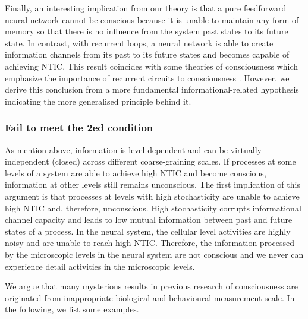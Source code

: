 \documentclass[utf8]{article}
\begin{document}
    		Finally, an interesting implication from our theory is that a pure feedforward neural network cannot be conscious because it is unable to maintain any form of memory so that there is no influence from the system past states to its future state. In contrast, with recurrent loops, a neural network is able to create information channels from its past to its future states and becomes capable of achieving NTIC. This result coincides with some theories of consciousness which emphasize the importance of recurrent circuits to consciousness \citep{lamme2006towards, edelman1992bright, tononi2008neural}.
    		However, we derive this conclusion from a more fundamental informational-related hypothesis indicating the more generalised principle behind it. 


        \subsubsection*{Fail to meet the 2\lowercase{ed} condition}
        As mention above, information is level-dependent and can be virtually independent (closed) across different coarse-graining scales. If processes at some levels of a system are able to achieve high NTIC and become conscious, information at other levels still remains unconscious. The first implication of this argument is that processes at levels with high stochasticity are unable to achieve high NTIC and, therefore, unconscious. High stochasticity corrupts informational channel capacity and leads to low mutual information between past and future states of a process. In the neural system, the cellular level activities are highly noisy and are unable to reach high NTIC. Therefore, the information processed by the microscopic levels in the neural system are not conscious and we never can experience detail activities in the microscopic levels. 
        
        
        We argue that many mysterious results in previous research of consciousness are originated from inappropriate biological and behavioural measurement scale. In the following, we list some examples. 
        
\end{document}
